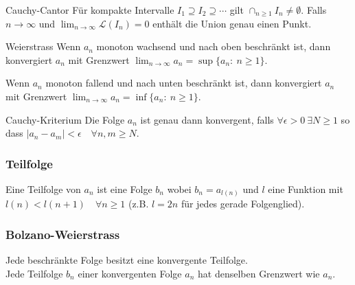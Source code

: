 \documentclass[a4paper,10pt]{article}
\def\limn{\lim_{n\to \infty}}
\begin{document}
\begin{subbox}{Cauchy-Cantor}
  Für kompakte Intervalle $I_1 \supseteq I_2 \supseteq \cdots$ gilt $\cap_{n \geq 1} I_n \neq \emptyset$. Falls $n \to \infty$ und $\limn \mathcal{L}(I_n) = 0$ enthält die Union genau einen Punkt.
\end{subbox}

\begin{mainbox}{Weierstrass}
Wenn $a_n$ monoton wachsend und nach oben beschränkt ist, dann konvergiert $a_n$ mit Grenzwert $\limn a_n = \sup \{a_n : \ n \ge 1\}$.

Wenn $a_n$ monoton fallend und nach unten beschränkt ist, dann konvergiert $a_n$ mit Grenzwert $\limn a_n = \inf \{a_n : \ n \ge 1\}$.
\end{mainbox}

\begin{mainbox}{Cauchy-Kriterium}
Die Folge $a_n$ ist genau dann konvergent, falls $\forall \epsilon > 0 \ \exists N \ge 1$ so dass $| a_n - a_m | < \epsilon \quad \forall n,m \ge N$.
\end{mainbox}

\subsubsection{Teilfolge}
Eine Teilfolge von $a_n$ ist eine Folge $b_n$ wobei $b_n = a_{l(n)}$ und $l$ eine Funktion mit $l(n) < l(n+1) \quad \forall n \ge 1$ (z.B. $l = 2n$ für jedes gerade Folgenglied). 

\subsubsection{Bolzano-Weierstrass}
Jede beschränkte Folge besitzt eine konvergente Teilfolge.\\
Jede Teilfolge $b_n$ einer konvergenten Folge $a_n$ hat denselben Grenzwert wie $a_n$.
\end{document}
